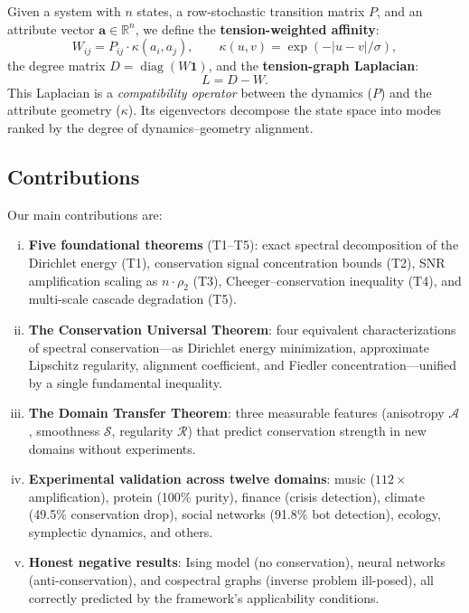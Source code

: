 \documentclass[12pt,letterpaper]{article}
\newcommand{\R}{\mathbb{R}}
\newcommand{\One}{\mathbf{1}}
\newcommand{\bfa}{\mathbf{a}}
\newcommand{\diag}{\operatorname{diag}}
\newcommand{\cA}{\mathcal{A}}
\newcommand{\cS}{\mathcal{S}}
\newcommand{\cR}{\mathcal{R}}
\begin{document}
Given a system with $n$ states, a row-stochastic transition matrix $P$, and an attribute vector $\bfa \in \R^n$, we define the \textbf{tension-weighted affinity}:
\begin{equation}
\label{eq:tension-weight}
  W_{ij} = P_{ij} \cdot \kappa(a_i, a_j), \qquad \kappa(u,v) = \exp(-|u - v|/\sigma),
\end{equation}
the degree matrix $D = \diag(W\One)$, and the \textbf{tension-graph Laplacian}:
\begin{equation}
\label{eq:tension-laplacian}
  L = D - W.
\end{equation}
This Laplacian is a \emph{compatibility operator} between the dynamics ($P$) and the attribute geometry ($\kappa$). Its eigenvectors decompose the state space into modes ranked by the degree of dynamics--geometry alignment.

\subsection{Contributions}

Our main contributions are:
\begin{enumerate}[(i)]
  \item \textbf{Five foundational theorems} (T1--T5): exact spectral decomposition of the Dirichlet energy (T1), conservation signal concentration bounds (T2), SNR amplification scaling as $n \cdot \rho_2$ (T3), Cheeger--conservation inequality (T4), and multi-scale cascade degradation (T5).
  \item \textbf{The Conservation Universal Theorem}: four equivalent characterizations of spectral conservation---as Dirichlet energy minimization, approximate Lipschitz regularity, alignment coefficient, and Fiedler concentration---unified by a single fundamental inequality.
  \item \textbf{The Domain Transfer Theorem}: three measurable features (anisotropy $\cA$, smoothness $\cS$, regularity $\cR$) that predict conservation strength in new domains without experiments.
  \item \textbf{Experimental validation across twelve domains}: music ($112\times$ amplification), protein (100\% purity), finance (crisis detection), climate (49.5\% conservation drop), social networks (91.8\% bot detection), ecology, symplectic dynamics, and others.
  \item \textbf{Honest negative results}: Ising model (no conservation), neural networks (anti-conservation), and cospectral graphs (inverse problem ill-posed), all correctly predicted by the framework's applicability conditions.
\end{enumerate}
\end{document}
